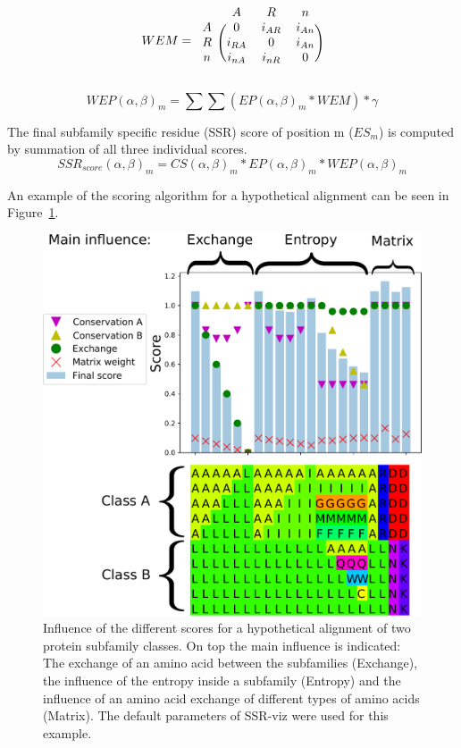 \documentclass[a4paper,10pt]{article}
\begin{document}
\begin{equation}  \label{eq:we}
WEM =
\begin{blockarray}{cccc}
 & A & R  & n  \\
\begin{block}{c(ccc)}
  A & 0 & i_{AR}  & i_{An} \\
  R & i_{RA} & 0  &  i_{An} \\
  n & i_{nA} &  i_{nR}  & 0 \\
\end{block}
\end{blockarray}
\end{equation}

\begin{equation} \label{eq:wep}
WEP(\alpha,\beta)_m = \sum\sum (EP(\alpha,\beta)_m * WEM) * \gamma
\end{equation}

The final subfamily specific residue (SSR) score of position m ($ES_m$) is computed by 
summation of all three individual scores.
\begin{equation}
SSR_{score}(\alpha, \beta)_m = CS(\alpha, \beta)_m * EP(\alpha, \beta)_m * WEP(\alpha, \beta)_m 
\end{equation}

An example of the scoring algorithm for a hypothetical alignment can be seen in Figure~\ref{fig:scoring_02bigger}.

\begin{figure}
  \includegraphics[width=\linewidth]{./figs/scoring_02bigger}
  \caption{Influence of the different scores for a hypothetical alignment of two protein subfamily classes. On top the main 
  influence is indicated: The exchange of an amino acid between the subfamilies (Exchange), the influence of
  the entropy inside a subfamily (Entropy) and the influence of an amino acid exchange of different 
  types of amino acids (Matrix). The default parameters of SSR-viz were used for this example.
  }
  \label{fig:scoring_02bigger}
\end{figure}
\end{document}
